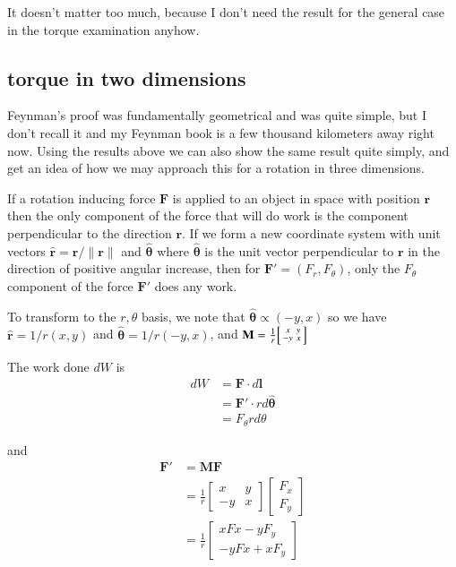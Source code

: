 \documentclass{article}      %
\newcommand{\norm}[1]{\lVert#1\rVert}
\newcommand{\Bl}[0]{\mathbf{l}}
\newcommand{\Br}[0]{\mathbf{r}}
\newcommand{\BF}[0]{\mathbf{F}}
\newcommand{\BM}[0]{\mathbf{M}}
\newcommand{\Btheta}[0]{\boldsymbol{\theta}}
\newcommand{\rcap}[0]{\hat{\Br}}
\newcommand{\thetacap}[0]{\hat{\Btheta}}
\newcommand{\inv}[1]{\frac{1}{#1}}
\begin{document}
It doesn't matter too much, because I don't need the result for the general case in the torque examination anyhow.

\subsection{torque in two dimensions}

Feynman's proof was fundamentally geometrical and was quite simple, but I don't recall it and my Feynman book is
a few thousand kilometers away right now.  Using the results above we can also show the same result quite simply,
and get an idea of how we may approach this for a rotation in three dimensions.

If a rotation inducing force $\BF$ is applied to an object in space with position $\Br$ then the only component of the
force that will do work is the component perpendicular to the direction $\Br$.  If we form a new coordinate system
with unit vectors $\rcap = \Br/\norm{\Br}$ and $\thetacap$ where $\thetacap$ is the unit vector perpendicular to $\Br$
in the direction of positive angular increase, then for
$\BF' = (F_r, F_\theta)$, only the $F_\theta$
component of the force $\BF'$ does any work.

To transform to the $r,\theta$ basis, we note that $\thetacap \propto (-y, x)$ so we have
$\rcap = 1/r(x,y)$ and $\thetacap = 1/r(-y,x)$, and $\BM =
\inv{r}
\Bigl[
\begin{smallmatrix}
 x & y \\
-y & x
\end{smallmatrix}
\Bigr]
$

The work done $dW$ is
\begin{align*}
dW &= \BF \cdot d\Bl \\
   &= \BF' \cdot r d\thetacap \\
   &= F_\theta r d\theta
\end{align*}

and
\begin{align*}
\BF' &= \BM \BF \\
     &=
\inv{r}
\begin{bmatrix}
 x & y \\
-y & x
\end{bmatrix}
\begin{bmatrix}
 F_x \\
 F_y
\end{bmatrix} \\
     &=
\inv{r}
\begin{bmatrix}
 x Fx - y F_y \\
-y Fx + x F_y
\end{bmatrix}
\end{align*}
\end{document}
